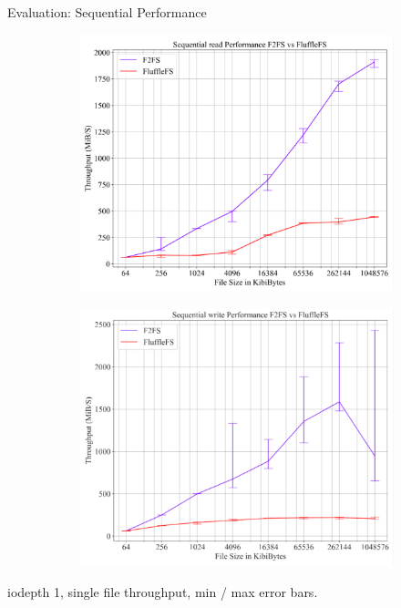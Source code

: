 \documentclass{beamer}
\begin{document}
\begin{frame}{Evaluation: Sequential Performance}
	\begingroup
	\begin{figure}
		\begin{subfigure}{0.5\textwidth}
			\centering
			\includegraphics[width=1.0\linewidth]{resources/images/results-sequential.pdf}
		\end{subfigure}%
		\begin{subfigure}{0.5\textwidth}
			\centering
			\includegraphics[width=1.0\linewidth]{resources/images/results-sequential-write.pdf}
		\end{subfigure}
	\end{figure}
	\tiny iodepth 1, single file throughput, min / max error bars.
	\endgroup
\end{frame}
\end{document}
